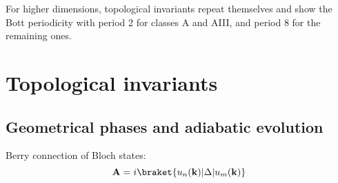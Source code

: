 For higher dimensions, topological invariants repeat themselves and show the Bott periodicity with period 2 for classes A and AIII, and period 8 for the remaining ones.

\section{Topological invariants}
\subsection{Geometrical phases and adiabatic evolution}



Berry connection of Bloch states:
\begin{equation}
\mathbf{A} = i \braket{u_n (\mathbf{k} )| \Delta  | u_m (\mathbf{k} ) }
\label{eq:berryconn}
\end{equation}

